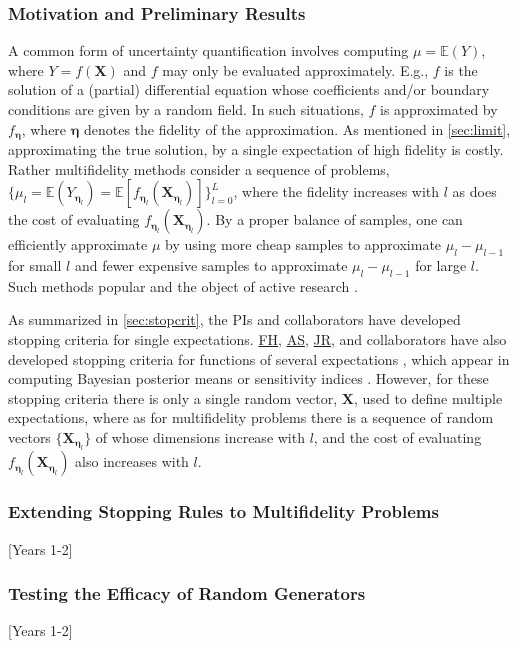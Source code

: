 \documentclass[11pt]{NSFamsart}
\newcommand{\FH}{\hyperlink{FHlink}{FH}\xspace}
\newcommand{\JR}{\hyperlink{JRlink}{JR}\xspace}
\newcommand{\AS}{\hyperlink{ASlink}{AS}\xspace}
\newcommand{\fidparam}{\bldeta}
\newcommand{\bbE}{\mathbb{E}}
\newcommand{\bX}{{\boldsymbol{X}}}
\newcommand{\bldeta}{{\boldsymbol{\eta}}}
\begin{document}
\subsubsection{Motivation and Preliminary Results} A common form of uncertainty quantification involves computing $\mu = \bbE(Y)$, where $Y=f(\bX)$ and $f$ may only be evaluated approximately.  E.g., $f$ is the solution of a (partial) differential equation whose coefficients and/or boundary conditions are given by a random field.  In such situations, $f$ is approximated by $f_\fidparam$, where $\fidparam$ denotes the fidelity of the approximation.  As mentioned in \cref{sec:limit}, approximating the true solution, by a single expectation of high fidelity is costly.  Rather multifidelity methods consider a sequence of problems, $\{\mu_l = \bbE(Y_{\fidparam_l})=\bbE[f_{\fidparam_l}(\bX_{\fidparam_l})] \}_{l=0}^L$, where the fidelity increases with $l$ as does the cost of evaluating $f_{\fidparam_l}(\bX_{\fidparam_l})$.  By a proper balance of samples, one can efficiently approximate $\mu$ by using more cheap samples to approximate $\mu_l - \mu_{l-1}$ for small $l$ and fewer  expensive samples to approximate $\mu_l - \mu_{l-1}$ for large $l$.  Such methods popular and the object of active research \cite{Hei01a, Gil15a, HajNobTem16a}.

As summarized in \cref{sec:stopcrit}, the PIs and collaborators have developed stopping criteria for single expectations.  \FH, \AS,  \JR, and collaborators have also developed stopping criteria for functions of several expectations \cite{HicEtal17a, JagSor23a}, which appear in computing Bayesian posterior means \cite{GelEtal13} or sensitivity indices \cite{Sob01,Sal02a,SalEtal08a}.  However, for these stopping criteria there is only a single random vector, $\bX$, used to define multiple expectations, where as for multifidelity problems there is a sequence of random vectors $\{\bX_{\fidparam_l}\}$ of whose dimensions increase with $l$, and the cost of evaluating $f_{\fidparam_l}(\bX_{\fidparam_l})$ also increases with  $l$.

\subsubsection{Extending Stopping Rules to Multifidelity Problems}[Years 1-2]



\subsubsection{Testing the Efficacy of Random Generators}[Years 1-2]
\end{document}
